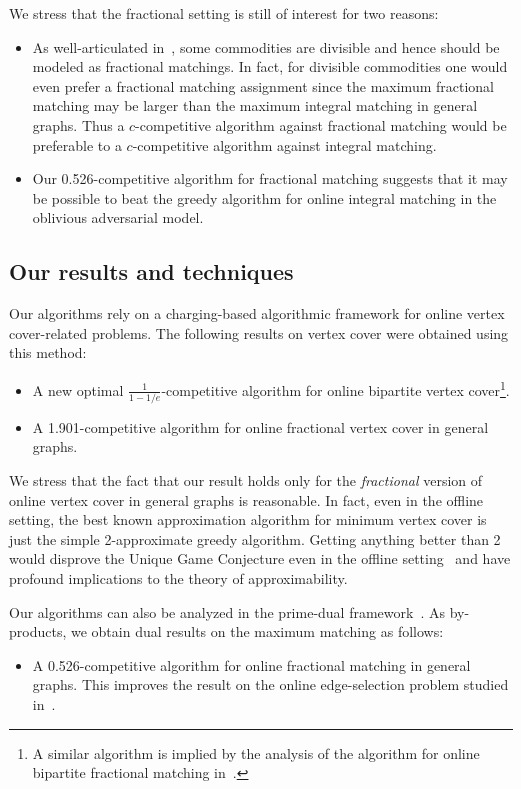 \documentclass{article}
\begin{document}
We stress that the fractional setting is still of interest for two reasons:

\begin{itemize}
\item As well-articulated in~\cite{Buchbinder2007}, some commodities are divisible and hence should be modeled as fractional matchings. In fact, for divisible commodities one would even prefer a fractional matching assignment since the maximum fractional matching may be larger than the maximum integral matching in general graphs. Thus a $c$-competitive algorithm against fractional matching would be preferable to a $c$-competitive algorithm against integral matching.
\item Our 0.526-competitive algorithm for fractional matching suggests that it may be possible to beat the greedy algorithm for online integral matching in the oblivious adversarial model.
\end{itemize}

\subsection{Our results and techniques}

Our algorithms rely on a charging-based algorithmic framework for online vertex cover-related problems. The following results on vertex cover were obtained using this method:
\begin{itemize}
\item A new optimal $\frac{1}{1-1/e}$-competitive algorithm for online bipartite vertex cover\footnote{A similar algorithm is implied by the analysis of the algorithm for online bipartite fractional matching in~\cite{Buchbinder2007}.}.
\item A 1.901-competitive algorithm for online fractional vertex cover in general graphs.
\end{itemize}

We stress that the fact that our result holds only for the \emph{fractional} version of online vertex cover in general graphs is reasonable. In fact, even in the offline setting, the best known approximation algorithm for minimum vertex cover is just the simple 2-approximate greedy algorithm. Getting anything better than 2 would disprove the Unique Game Conjecture even in the offline setting~\cite{Khot2008} and have profound implications to the theory of approximability.

Our algorithms can also be analyzed in the prime-dual framework~\cite{Buchbinder2007}. As by-products, we obtain dual results on the maximum matching as follows:
\begin{itemize}
\item A 0.526-competitive algorithm for online fractional matching in general graphs. This improves the result on the online edge-selection problem studied in~\cite{Blum2006}.
\end{itemize}
\end{document}
